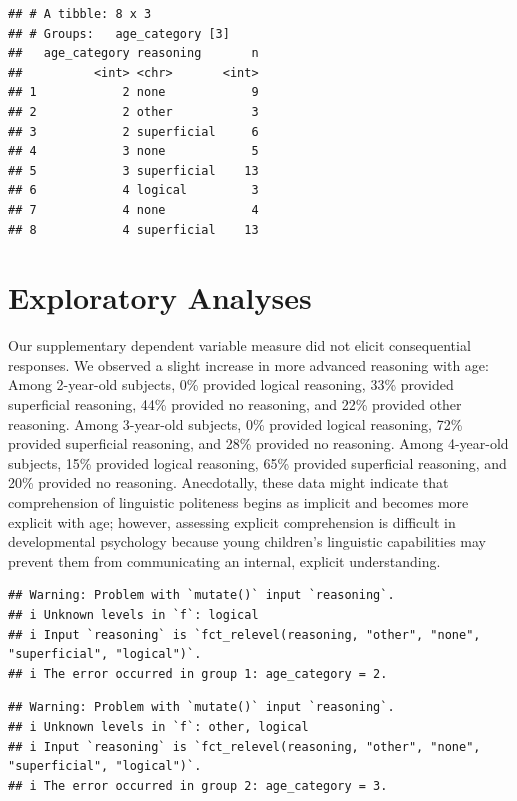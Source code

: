 \documentclass[
  english,
  man,floatsintext]{apa6}
\begin{document}
\newpage

\begin{verbatim}
## # A tibble: 8 x 3
## # Groups:   age_category [3]
##   age_category reasoning       n
##          <int> <chr>       <int>
## 1            2 none            9
## 2            2 other           3
## 3            2 superficial     6
## 4            3 none            5
## 5            3 superficial    13
## 6            4 logical         3
## 7            4 none            4
## 8            4 superficial    13
\end{verbatim}

\hypertarget{exploratory-analyses}{%
\section{Exploratory Analyses}\label{exploratory-analyses}}

Our supplementary dependent variable measure did not elicit consequential responses. We observed a slight increase in more advanced reasoning with age: Among 2-year-old subjects, 0\% provided logical reasoning, 33\% provided superficial reasoning, 44\% provided no reasoning, and 22\% provided other reasoning. Among 3-year-old subjects, 0\% provided logical reasoning, 72\% provided superficial reasoning, and 28\% provided no reasoning. Among 4-year-old subjects, 15\% provided logical reasoning, 65\% provided superficial reasoning, and 20\% provided no reasoning. Anecdotally, these data might indicate that comprehension of linguistic politeness begins as implicit and becomes more explicit with age; however, assessing explicit comprehension is difficult in developmental psychology because young children's linguistic capabilities may prevent them from communicating an internal, explicit understanding.

\begin{verbatim}
## Warning: Problem with `mutate()` input `reasoning`.
## i Unknown levels in `f`: logical
## i Input `reasoning` is `fct_relevel(reasoning, "other", "none", "superficial", "logical")`.
## i The error occurred in group 1: age_category = 2.
\end{verbatim}

\begin{verbatim}
## Warning: Problem with `mutate()` input `reasoning`.
## i Unknown levels in `f`: other, logical
## i Input `reasoning` is `fct_relevel(reasoning, "other", "none", "superficial", "logical")`.
## i The error occurred in group 2: age_category = 3.
\end{verbatim}
\end{document}
